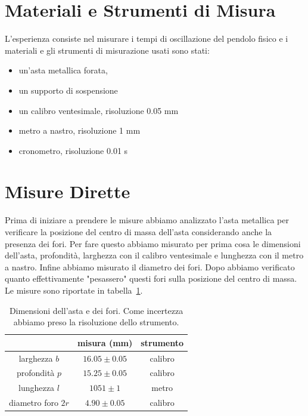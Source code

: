\documentclass[a4paper]{article}
\begin{document}
\section{Materiali e Strumenti di Misura}\label{sec:materiali}
L'esperienza consiste nel misurare i tempi di oscillazione del pendolo fisico e i materiali e gli strumenti di misurazione usati sono stati:
\begin{itemize}
    \item un'asta metallica forata,
    \item un supporto di sospensione
    \item un calibro ventesimale, risoluzione 0.05 mm
    \item metro a nastro, risoluzione 1 mm
    \item cronometro, risoluzione 0.01 s
\end{itemize}

\section{Misure Dirette}\label{sec:misure_dirette}
 Prima di iniziare a prendere le misure abbiamo analizzato l'asta metallica per verificare la posizione del centro di massa dell'asta considerando anche la presenza dei fori. Per fare questo abbiamo misurato per prima cosa le dimensioni dell'asta, profondità, larghezza con il calibro ventesimale e lunghezza con il metro a nastro. Infine abbiamo misurato il diametro dei fori.
 Dopo abbiamo verificato quanto effettivamente "pesassero" questi fori sulla posizione del centro di massa.
 Le misure sono riportate in tabella~\ref{tab:asta}.

\begin{table}[H]
    \centering
    \begin{tabular}{c|c|c}
      & misura (mm) & strumento\\
      \hline
      larghezza $b$ & $16.05 \pm 0.05$ & calibro \\
      profondità $p$ & $15.25 \pm 0.05$ & calibro \\
      lunghezza $l$ & $1051 \pm 1$ & metro \\
      diametro foro $2r$ & $4.90 \pm 0.05$ & calibro \\
    \end{tabular}
    \caption{Dimensioni dell'asta e dei fori. Come incertezza abbiamo preso la risoluzione dello strumento.}
    \label{tab:asta}
\end{table}
\end{document}
